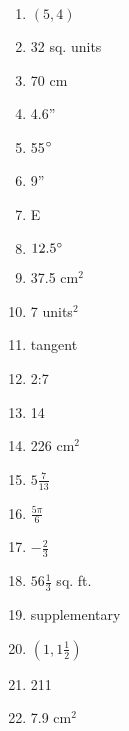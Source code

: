 \documentclass[../uilmath.tex]{subfiles}
\begin{document}
\begin{enumerate}[label=\bfseries\arabic*.]
    \item %
    $(5,4)$

    \item %
    32 sq. units 

    \item %
    70 cm 

    \item %
    4.6''

    \item %
    55$\degree$

    \item %
    9''

    \item %
    E 

    \item %
    $12.5\degree$

    \item %
    37.5 cm$^2$

    \item %
    7 units$^2$

    \item %
    tangent 

    \item %
    2:7

    \item %
    14

    \item %
    226 cm$^2$

    \item %
    $5\frac{7}{13}$

    \item %
    $\frac{5\pi}{6}$

    \item %
    $-\frac{2}{3}$

    \item %
    $56\frac{1}{3}$ sq. ft. 

    \item %
    supplementary

    \item %
    $(1,1\frac{1}{2})$

    \item %
    211

    \item %
    7.9 cm$^2$


\end{enumerate}
\end{document}
